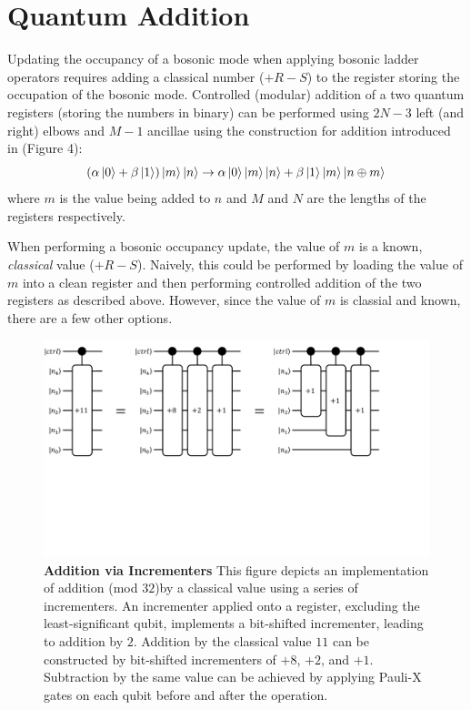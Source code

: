 \section{Quantum Addition}
\label{sec:addition}

Updating the occupancy of a bosonic mode when applying bosonic ladder operators requires adding a classical number ($+ R - S$) to the register storing the occupation of the bosonic mode.
Controlled (modular) addition of a two quantum registers (storing the numbers in binary) can be performed using $2N - 3$ left (and right) elbows and $M - 1$ ancillae using the construction for addition introduced in \cite{gidney2018halving} (Figure 4):
\begin{equation}
    (\alpha \ket{0} + \beta \ket{1})\ket{m}\ket{n} \rightarrow \alpha \ket{0}\ket{m}\ket{n} + \beta \ket{1}\ket{m}\ket{n \oplus m}
\end{equation}
where $m$ is the value being added to $n$ and $M$ and $N$ are the lengths of the registers respectively.

When performing a bosonic occupancy update, the value of $m$ is a known, \textit{classical} value ($+ R - S$).
Naively, this could be performed by loading the value of $m$ into a clean register and then performing controlled addition of the two registers as described above.
However, since the value of $m$ is classial and known, there are a few other options.

\begin{figure}
    \centering
    \includegraphics[width=16cm]{figures/addition-via-incrementers.pdf}
    \caption{
        \textbf{Addition via Incrementers} 
        This figure depicts an implementation of addition (mod $32$)by a classical value using a series of incrementers.
        An incrementer applied onto a register, excluding the least-significant qubit, implements a bit-shifted incrementer, leading to addition by $2$. 
        Addition by the classical value $11$ can be constructed by bit-shifted incrementers of $+8$, $+2$, and $+1$.
        Subtraction by the same value can be achieved by applying Pauli-X gates on each qubit before and after the operation.
    }
    \label{fig:addition-via-incrementers}
\end{figure}

